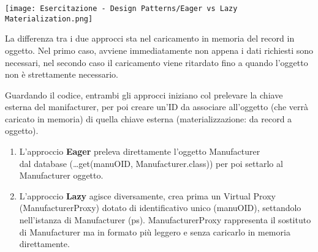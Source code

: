 \begin{center}
    \texttt{[image: Esercitazione - Design Patterns/Eager vs Lazy Materialization.png]}
\end{center}

La differenza tra i due approcci sta nel caricamento in memoria del record in oggetto. Nel primo caso, avviene immediatamente
non appena i dati richiesti sono necessari, nel secondo caso il caricamento viene ritardato fino a quando l'oggetto non è
strettamente necessario.

Guardando il codice, entrambi gli approcci iniziano col prelevare la chiave\\ esterna del manifacturer, per poi creare un'ID da
associare all'oggetto (che verrà caricato in memoria) di quella chiave esterna (materializzazione: da record a oggetto).

\begin{enumerate}
    \item L'approccio \textbf{Eager} preleva direttamente l'oggetto Manufacturer \\dal database (\dots get(manuOID, Manufacturer.class))
    per poi settarlo al\\ Manufacturer oggetto.
    \item L'approccio \textbf{Lazy} agisce diversamente, crea prima un Virtual Proxy (ManufacturerProxy) dotato di identificativo
    unico (manuOID), settandolo nell'istanza di Manufacturer (ps). ManufacturerProxy rappresenta il sostituto di Manufacturer
    ma in formato più leggero e senza caricarlo in memoria direttamente.
\end{enumerate}